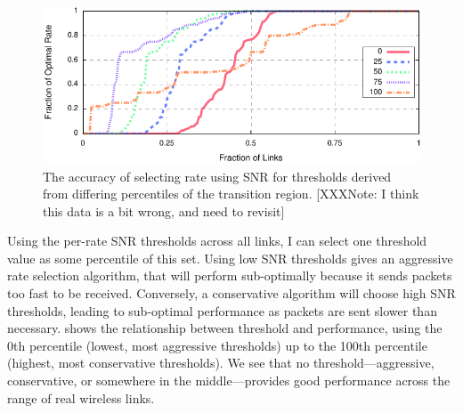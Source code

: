 \begin{figure}[t]
	\centering
	\includegraphics[width=\textwidth]{figures/thresh_vs_opt.pdf}
	\caption[The accuracy of selecting rate using SNR for thresholds derived from differing percentiles of the transition region.]{\label{fig:thresh_vs_opt}The accuracy of selecting rate using SNR for thresholds derived from differing percentiles of the transition region. [XXXNote: I think this data is a bit wrong, and need to revisit]}
\end{figure}
Using the per-rate SNR thresholds across all links, I can select one threshold value as some percentile of this set. Using low SNR thresholds gives an aggressive rate selection algorithm, that will perform sub-optimally because it sends packets too fast to be received.  Conversely, a conservative algorithm will choose high SNR thresholds, leading to sub-optimal performance as packets are sent slower than necessary.  shows the relationship between threshold and performance, using the 0th percentile (lowest, most aggressive thresholds) up to the 100th percentile (highest, most conservative thresholds). We see that no threshold---aggressive, conservative, or somewhere in the middle---provides good performance across the range of real wireless links.

